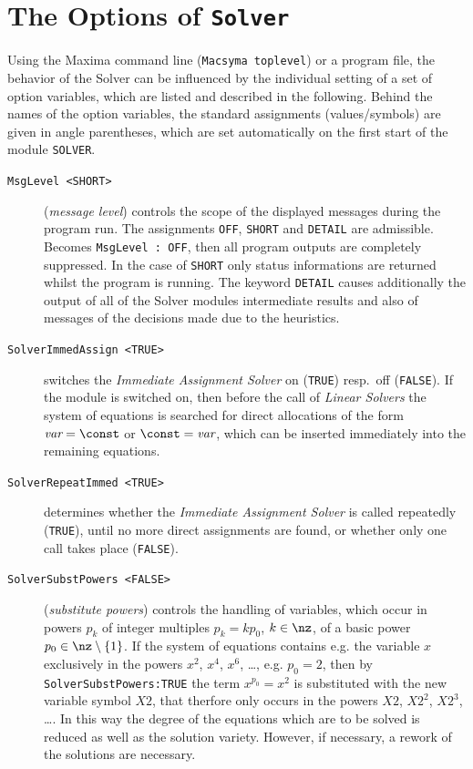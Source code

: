 \section{\label{Optionen}The Options of {\tt Solver}}  %
 
Using  the Maxima command line (\verb+Macsyma toplevel+) or a program file, the behavior of the Solver can be influenced by the individual setting of a set of option variables, which are listed and described in the following. Behind the names of the option variables, the standard assignments (values/symbols) are given  in angle parentheses, which are set automatically on the first start of the module \verb+SOLVER+.

\begin{description}

\item[{\tt MsgLevel <SHORT>}] ({\em message level}) 
controls the scope of the displayed messages during the program run. The assignments \verb+OFF+, \verb+SHORT+ and
\verb+DETAIL+ are admissible. 
\nl
Becomes  \verb+MsgLevel : OFF+, then all program outputs are completely suppressed. In the case of  \verb+SHORT+ only status informations are returned whilst the program is running. The keyword \verb+DETAIL+  causes additionally the output of all of the Solver modules intermediate results and also of messages of the decisions made due to the heuristics.
%
%
\item[{\tt SolverImmedAssign <TRUE>}] 
switches the {\em Immediate 
Assignment Solver} on (\verb+TRUE+) resp.\ off (\verb+FALSE+). If the module is switched on, then before the call of {\em Linear Solvers} the system of equations is searched for direct allocations of the form $\mbox{\em 
var} = \const$ or $\const = \mbox{\em var}$, which can be inserted immediately into the remaining equations.
%
%
\item[{\tt SolverRepeatImmed <TRUE>}] 
determines whether the {\em Immediate 
Assignment Solver}  is called repeatedly (\verb+TRUE+), until no more direct assignments are found, or whether only one call takes place  (\verb+FALSE+).
%
\item[{\tt SolverSubstPowers <FALSE>}] ({\em substitute powers})
controls the handling of variables, which occur in powers $p_k$
of integer multiples $p_k=k p_0$, $k \in \nz$, of a basic power $p_0
\in \nz \setminus \{ 1 \}$.
If the system of equations contains e.g. the variable  $x$ exclusively in the powers $x^2$, $x^4$,
$x^6$, \ldots, e.g. $p_0=2$, then  by \verb+SolverSubstPowers:TRUE+ the term $x^{p_0}=x^2$ is substituted with the
new variable symbol $X2$, that therfore only occurs in the powers $X2$, $X2^2$, $X2^3$, \ldots. 
In this way the degree of the equations which are to be solved is reduced as well as the solution variety. 
However, if necessary, a rework of the solutions are necessary.
%


\end{description}
